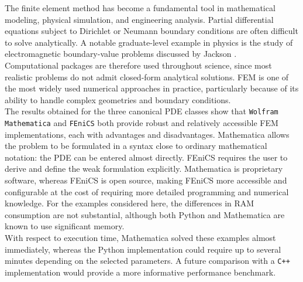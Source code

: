 \documentclass[a4paper]{article}
\begin{document}
The finite element method has become a fundamental tool in mathematical modeling, physical simulation, and engineering analysis. Partial differential equations subject to Dirichlet or Neumann boundary conditions are often difficult to solve analytically. A notable graduate-level example in physics is the study of electromagnetic boundary-value problems discussed by Jackson \cite{Jackson}.\\

Computational packages are therefore used throughout science, since most realistic problems do not admit closed-form analytical solutions. FEM is one of the most widely used numerical approaches in practice, particularly because of its ability to handle complex geometries and boundary conditions.\\

The results obtained for the three canonical PDE classes show that \texttt{Wolfram Mathematica} and \texttt{FEniCS} both provide robust and relatively accessible FEM implementations, each with advantages and disadvantages. Mathematica allows the problem to be formulated in a syntax close to ordinary mathematical notation: the PDE can be entered almost directly. FEniCS requires the user to derive and define the weak formulation explicitly. Mathematica is proprietary software, whereas FEniCS is open source, making FEniCS more accessible and configurable at the cost of requiring more detailed programming and numerical knowledge. For the examples considered here, the differences in RAM consumption are not substantial, although both Python and Mathematica are known to use significant memory.\\
With respect to execution time, Mathematica solved these examples almost immediately, whereas the Python implementation could require up to several minutes depending on the selected parameters. A future comparison with a \texttt{C++} implementation would provide a more informative performance benchmark.
\end{document}
